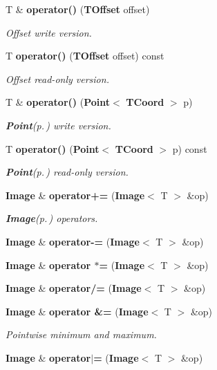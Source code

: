 \begin{CompactItemize}
T \& {\bf operator()} ({\bf TOffset} offset)
\begin{CompactList}\small\item\em Offset write version. \item\end{CompactList}\item 
T {\bf operator()} ({\bf TOffset} offset) const 
\begin{CompactList}\small\item\em Offset read-only version. \item\end{CompactList}\item 
T \& {\bf operator()} ({\bf Point}$<$ {\bf TCoord} $>$ p)
\begin{CompactList}\small\item\em {\bf Point}{\rm (p.\,\pageref{classLibTIM_1_1Point})} write version. \item\end{CompactList}\item 
T {\bf operator()} ({\bf Point}$<$ {\bf TCoord} $>$ p) const 
\begin{CompactList}\small\item\em {\bf Point}{\rm (p.\,\pageref{classLibTIM_1_1Point})} read-only version. \item\end{CompactList}\item 
{\bf Image} \& {\bf operator+=} ({\bf Image}$<$ T $>$ \&op)
\begin{CompactList}\small\item\em {\bf Image}{\rm (p.\,\pageref{classLibTIM_1_1Image})} operators. \item\end{CompactList}\item 
{\bf Image} \& {\bf operator-=} ({\bf Image}$<$ T $>$ \&op)
\item 
{\bf Image} \& {\bf operator $\ast$=} ({\bf Image}$<$ T $>$ \&op)
\item 
{\bf Image} \& {\bf operator/=} ({\bf Image}$<$ T $>$ \&op)
\item 
{\bf Image} \& {\bf operator \&=} ({\bf Image}$<$ T $>$ \&op)
\begin{CompactList}\small\item\em Pointwise minimum and maximum. \item\end{CompactList}\item 
{\bf Image} \& {\bf operator$|$=} ({\bf Image}$<$ T $>$ \&op)
\item 

\end{CompactItemize}
